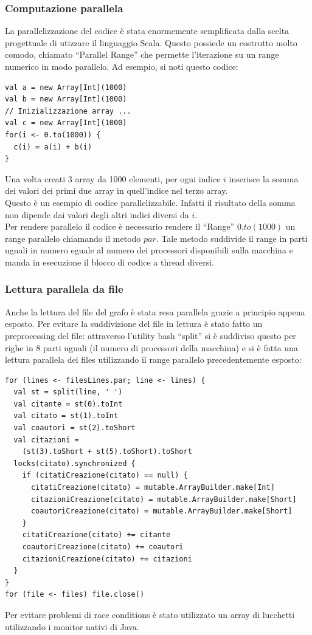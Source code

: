 \documentclass[a4paper, 12pt]{article}
\begin{document}
\subsubsection{Computazione parallela}
La parallelizzazione del codice è stata enormemente semplificata dalla scelta progettuale di utizzare il linguaggio Scala. Questo possiede un costrutto molto comodo, chiamato ``Parallel Range'' che permette l'iterazione su un range numerico in modo parallelo.
Ad esempio, si noti questo codice:
\begin{lstlisting}[keepspaces=true]
val a = new Array[Int](1000)
val b = new Array[Int](1000)
// Inizializzazione array ...
val c = new Array[Int](1000)
for(i <- 0.to(1000)) {
  c(i) = a(i) + b(i)
}
\end{lstlisting}
Una volta creati 3 array da 1000 elementi, per ogni indice $i$ inserisce la somma dei valori dei primi due array in quell'indice nel terzo array. \\
Questo è un esempio di codice parallelizzabile. Infatti il risultato della somma non dipende dai valori degli altri indici diversi da $i$. \\
Per rendere parallelo il codice è necessario rendere il ``Range'' $0.to(1000)$ un range parallelo chiamando il metodo $par$. Tale metodo suddivide il range in parti uguali in numero eguale al numero dei processori disponibili sulla macchina e manda in esecuzione il blocco di codice a thread diversi.
\subsubsection{Lettura parallela da file}
Anche la lettura del file del grafo è stata resa parallela grazie a principio appena esposto. Per evitare la suddivizione del file in lettura è stato fatto un preprocessing del file: attraverso l'utility bash ``split'' si è suddiviso questo per righe in 8 parti uguali (il numero di processori della macchina) e si è fatta una lettura parallela dei files utilizzando il range parallelo precedentemente esposto:
\begin{lstlisting}[keepspaces=true]
for (lines <- filesLines.par; line <- lines) {
  val st = split(line, ' ')
  val citante = st(0).toInt
  val citato = st(1).toInt
  val coautori = st(2).toShort
  val citazioni =
    (st(3).toShort + st(5).toShort).toShort
  locks(citato).synchronized {
    if (citatiCreazione(citato) == null) {
      citatiCreazione(citato) = mutable.ArrayBuilder.make[Int]
      citazioniCreazione(citato) = mutable.ArrayBuilder.make[Short]
      coautoriCreazione(citato) = mutable.ArrayBuilder.make[Short]
    }
    citatiCreazione(citato) += citante
    coautoriCreazione(citato) += coautori
    citazioniCreazione(citato) += citazioni
  }
}
for (file <- files) file.close()
\end{lstlisting}
Per evitare problemi di race conditions è stato utilizzato un array di lucchetti utilizzando i monitor nativi di Java.
\end{document}
